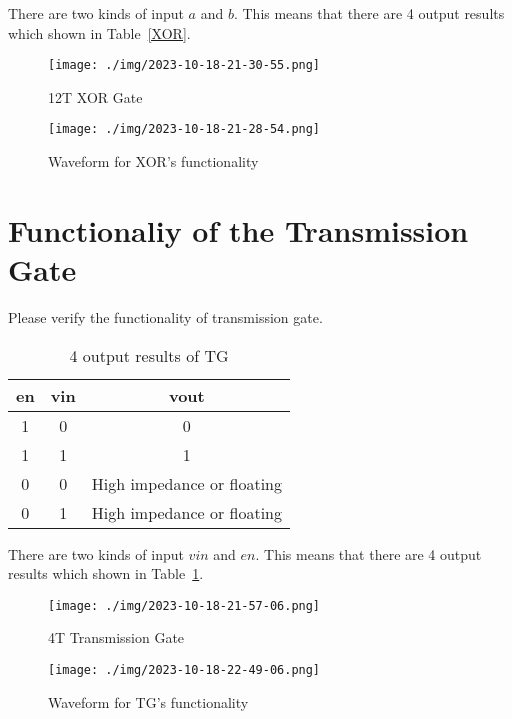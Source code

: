 \documentclass{article}
\begin{document}
\begin{itemize}
There are two kinds of input $a$ and $b$. This means that there are 4 output results which shown in Table~\ref{XOR}.


\begin{figure}[H]
    \centering
    \begin{minipage}[t]{0.25\textwidth}
    \centering
        \texttt{[image: ./img/2023-10-18-21-30-55.png]}
    \caption{12T XOR Gate}
    \label{xor1}
    \end{minipage}
    \qquad
    \begin{minipage}[t]{0.5\textwidth}
    \centering
        \texttt{[image: ./img/2023-10-18-21-28-54.png]}
    \caption{Waveform for XOR's functionality}
    \label{xor2}
    \end{minipage}
\end{figure}

        \end{itemize}
        
    \section{ Functionaliy of the Transmission Gate}

Please verify the functionality of transmission gate.

\begin{table}[H]
    \centering\large
    \caption{4 output results of TG}
    \begin{tabular}{|c|c|c|}
        \hline
        \textbf{en} & \textbf{vin} & \textbf{vout}  \\
        \hline
        1 & 0 & 0\\
        \hline
        1 & 1 & 1\\
        \hline
        0 & 0 & High impedance or floating\\
        \hline
        0 & 1 & High impedance or floating \\ \hline
    \end{tabular}
    \label{TG}
\end{table}

There are two kinds of input $vin$ and $en$. This means that there are 4 output results which shown in Table~\ref{TG}.

\begin{figure}[H]
    \centering
    \begin{minipage}[t]{0.3\textwidth}
    \centering
        \texttt{[image: ./img/2023-10-18-21-57-06.png]}
    \caption{4T Transmission Gate}
    \label{TG1}
    \end{minipage}
    \qquad
    \begin{minipage}[t]{0.6\textwidth}
    \centering
        \texttt{[image: ./img/2023-10-18-22-49-06.png]}
    \caption{Waveform for TG's functionality}
    \label{TG2}
    \end{minipage}
\end{figure}
 
\end{document}
